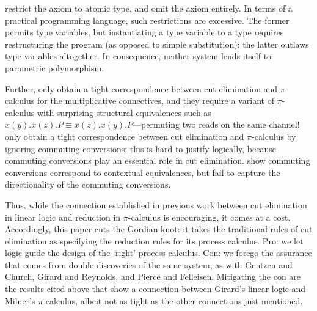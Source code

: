 \documentclass{jfp1}
\begin{document}
\citet{BellinScott94} restrict the axiom to atomic type, and
\citet{CairesPfenning10} omit the axiom entirely.  In terms of a
practical programming language, such restrictions are excessive.  The
former permits type variables, but instantiating a type variable to a
type requires restructuring the program (as opposed to simple
substitution); the latter outlaws type variables altogether.  In
consequence, neither system lends itself to parametric polymorphism.

Further, \citet{BellinScott94} only obtain a tight correspondence
between cut elimination and $\pi$-calculus for the multiplicative
connectives, and they require a variant of
$\pi$-calculus with surprising structural equivalences such as
$x(y).x(z).P \equiv x(z).x(y).P$---permuting two reads
on the same channel!  \citet{CairesPfenning10} only obtain a tight
correspondence between cut elimination and $\pi$-calculus by
ignoring commuting conversions; this is hard to
justify logically, because commuting conversions play an essential
role in cut elimination.  \citet{PerezEtAl12} show commuting
conversions correspond to contextual equivalences, but fail to capture
the directionality of the commuting conversions.



Thus, while the connection established in previous work between cut
elimination in linear logic and reduction in $\pi$-calculus is
encouraging, it comes at a cost.  Accordingly, this paper
cuts the Gordian knot: it takes the traditional rules of cut
elimination as specifying the reduction rules for its process
calculus.  Pro: we let logic guide the design of the `right'
process calculus.  Con: we forego the assurance that comes
from double discoveries of the same system, as with
Gentzen and Church, Girard and Reynolds, and Pierce and Felleisen.
Mitigating the con are the results cited above that
show a connection between Girard's linear logic and Milner's
$\pi$-calculus, albeit not as tight as the other connections
just mentioned.
\end{document}
